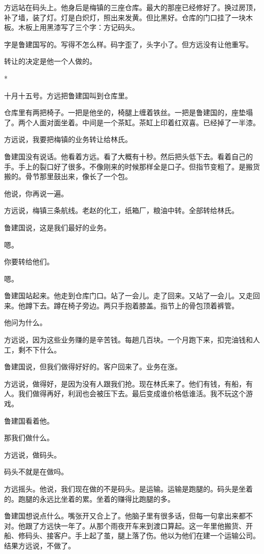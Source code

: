 \documentclass[UTF8,a5paper,11pt,openany]{ctexbook}
\newcommand{\scene}{\vspace{1em}\begin{center}*\quad*\quad*\end{center}\vspace{0.5em}}
\begin{document}
方远站在码头上。他身后是梅镇的三座仓库。最大的那座已经修好了。换过房顶，补了墙，装了灯。灯是白炽灯，照出来发黄。但比黑好。仓库的门口挂了一块木板。木板上用黑漆写了三个字：方记码头。

字是鲁建国写的。写得不怎么样。码字歪了，头字小了。但方远没有让他重写。

转让的决定是他一个人做的。


\scene

十月十五号。方远把鲁建国叫到仓库里。

仓库里有两把椅子。一把是他坐的，椅腿上缠着铁丝。一把是鲁建国的，座垫塌了。两个人面对面坐着。中间是一个茶缸。茶缸上印着红双喜。已经掉了一半漆。

方远说，我要把梅镇的业务转让给林氏。

鲁建国没有说话。他看着方远。看了大概有十秒。然后把头低下去。看着自己的手。手上的裂口好了很多。不像刚来的时候那样全是口子。但指节变粗了。是搬货搬的。骨节那里鼓出来，像长了一个包。

他说，你再说一遍。

方远说，梅镇三条航线。老赵的化工，纸箱厂，粮油中转。全部转给林氏。

鲁建国说，这是我们最好的业务。

嗯。

你要转给他们。

嗯。

鲁建国站起来。他走到仓库门口。站了一会儿。走了回来。又站了一会儿。又走回来。他蹲下去。蹲在椅子旁边。两只手抱着膝盖。指节上的骨包顶着裤管。

他问为什么。

方远说，因为这些业务赚的是辛苦钱。每趟几百块。一个月跑下来，扣完油钱和人工，剩不下什么。

鲁建国说，但我们做得好好的。客户回来了。业务在涨。

方远说，做得好，是因为没有人跟我们抢。现在林氏来了。他们有钱，有船，有人。我们做得再好，利润也会被压下去。最后变成谁价格低谁活。我不玩这个游戏。

鲁建国看着他。

那我们做什么。

方远说，做码头。

码头不就是在做吗。

方远摇头。他说，我们现在做的不是码头。是运输。运输是跑腿的。码头是坐着的。跑腿的永远比坐着的累。坐着的赚得比跑腿的多。

鲁建国想说点什么。嘴张开又合上了。他脑子里有很多话，但每一句拿出来都不对。他跟了方远快一年了。从那个雨夜开车来到渡口算起。这一年里他搬货、开船、修码头、接客户。手上起了茧，腿上落了伤。他以为他们在建一个运输公司。结果方远说，不做了。
\end{document}
